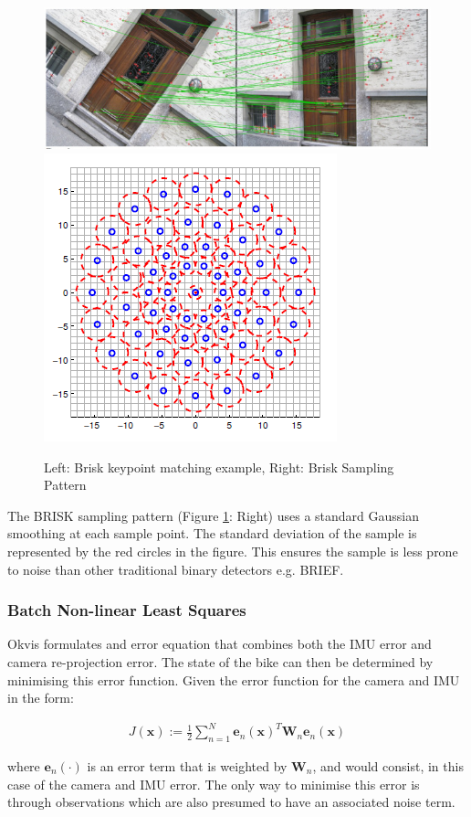 \documentclass[11pt,twoside]{report}
\begin{document}
\noindent \begin{figure}[H] 
	\includegraphics[width = 0.7\hsize]{figures/brisk.jpg}
	\includegraphics[width = 0.26\hsize]{figures/brisk.png}
	\caption{Left: Brisk keypoint matching example, Right: Brisk Sampling Pattern \cite{BRISK} }
	\label{Brisk}
\end{figure}

The BRISK sampling pattern (Figure \ref{Brisk}: Right) uses a standard Gaussian smoothing at each sample point. The standard deviation of the sample is represented by the red circles in the figure. This ensures the sample is less prone to noise than other traditional binary detectors e.g. BRIEF.


\subsubsection{Batch Non-linear Least Squares}

Okvis formulates and error equation that combines both the IMU error and camera re-projection error. The state of the bike can then be determined by minimising this error function. Given the error function for the camera and IMU in the form:

\begin{equation}
\begin{aligned}
J(\mathbf{x}) := \frac{1}{2} \sum_{n=1}^{N} \textbf{e}_{n} (\textbf{x})^{T} \textbf{W}_{n} \textbf{e}_{n}(\textbf{x}) 
\end{aligned}
\end{equation} 

where $\textbf{e}_{n}(\cdot)$ is an error term that is weighted by $\textbf{W}_{n}$, and would consist, in this case of the camera and IMU error. The only way to minimise this error is through observations which are also presumed to have an associated noise term.
\end{document}
